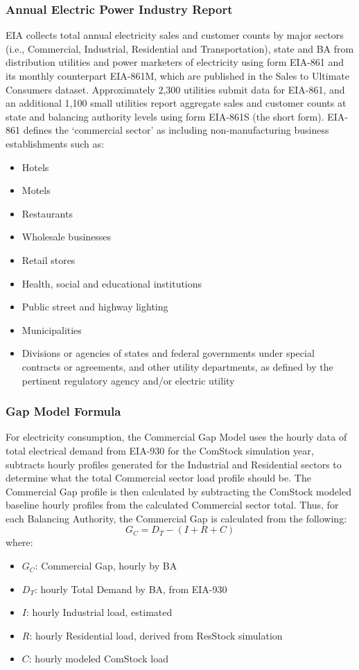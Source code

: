 \subsubsection{Annual Electric Power Industry Report}
EIA collects total annual electricity sales and customer counts by major sectors (i.e., Commercial, Industrial, Residential and Transportation), state and BA from distribution utilities and power marketers of electricity using form EIA-861 and its monthly counterpart EIA-861M, which are published in the Sales to Ultimate Consumers dataset. Approximately 2,300 utilities submit data for EIA-861, and an additional 1,100 small utilities report aggregate sales and customer counts at state and balancing authority levels using form EIA-861S (the short form). EIA-861 defines the ‘commercial sector’ as including non-manufacturing business establishments such as:
\begin{itemize}
    \item Hotels
    \item Motels
    \item Restaurants
    \item Wholesale businesses
    \item Retail stores
    \item Health, social and educational institutions
    \item Public street and highway lighting
    \item Municipalities
    \item Divisions or agencies of states and federal governments under special contracts or agreements, and other utility departments, as defined by the pertinent regulatory agency and/or electric utility
\end{itemize}

\subsubsection{Gap Model Formula}
For electricity consumption, the Commercial Gap Model uses the hourly data of total electrical demand from EIA-930 for the ComStock simulation year, subtracts hourly profiles generated for the Industrial and Residential sectors to determine what the total Commercial sector load profile should be. The Commercial Gap profile is then calculated by subtracting the ComStock modeled baseline hourly profiles from the calculated Commercial sector total. Thus, for each Balancing Authority, the Commercial Gap is calculated from the following:
\begin{equation}
G_{C} = D_{T} - (I + R + C)
\end{equation}
where:
\begin{itemize}
    \item $G_{C}$: Commercial Gap, hourly by BA
    \item $D_{T}$: hourly Total Demand by BA, from EIA-930
    \item $I$: hourly Industrial load, estimated
    \item $R$: hourly Residential load, derived from ResStock simulation
    \item $C$: hourly modeled ComStock load
\end{itemize}

